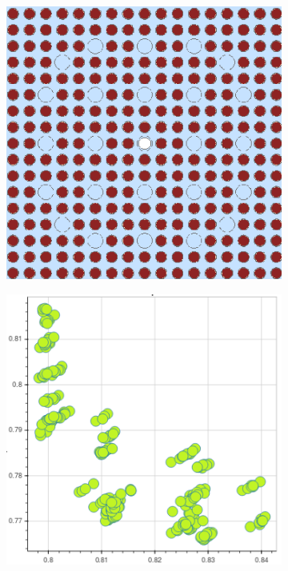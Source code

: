 
\begin{figure}[h!]
\centering
\begin{subfigure}{0.45\textwidth}
  \centering
  \includegraphics[width=0.9\linewidth]{figures/unsupervised/features/assm-16/geometry}
  \caption{}
  \label{fig:chap10-capt-mean-spect-ind-geom}
\end{subfigure}%
\begin{subfigure}{0.45\textwidth}
  \centering
  \includegraphics[width=0.9\linewidth]{figures/unsupervised/features/assm-16/u238-capt/mean-spect-ind-sum/mgxs}

\end{subfigure}
\end{figure}
